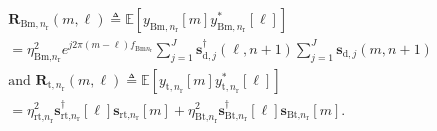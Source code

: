 \documentclass[9pt,journal]{IEEEtran}
\newcommand{\paren}[1]{\left({#1}\right)}
\newcommand{\bracket}[1]{{\left [{#1}\right ]}}
\newcommand{\rr}{_\mathrm{r}}
\newcommand{\B}{\textrm{B}}
\newcommand{\rnr}{_{\mathrm{r},n_\mathrm{r}}}
\newcommand{\target}{\mathrm{t}}
\newcommand{\PBj}{\mathbf{P}_{\textrm{d},j}\bracket{k}}
\newcommand{\PBjm}{\mathbf{P}_{\textrm{d},j}\bracket{m}}
\theoremstyle{definition}
\begin{document}
\begin{align}
&\mathbf{R}_{\mathrm{Bm},n\rr}\paren{m,\ell}\triangleq\mathbb{E}\bracket{y_{\mathrm{Bm},n\rr}\bracket{m}y^\ast_{\mathrm{Bm},n\rr}\bracket{\ell}}\nonumber\\
&=\eta^2_{\textrm{Bm,}n\rr}e^{j2\pi\paren{m-\ell}f_{\mathrm{Bm}n\rr}} \sum_{j=1}^{\mathit{J}}\mathbf{s}^\dagger_{\textrm{d},j}\paren{\ell,n+1}\sum_{j=1}^{\mathit{J}}\mathbf{s}_{\textrm{d},j}\paren{m,n+1}\nonumber\\
&\textrm{and }\mathbf{R}_{\target,n\rr}\paren{m,\ell}\triangleq\mathbb{E}\bracket{y_{\mathrm{t},n\rr}\bracket{m}y^\ast_{\mathrm{t},n\rr}\bracket{\ell}}\nonumber\\
&=\eta^2_{\textrm{rt,}n\rr}\mathbf{s}^\dagger_{\textrm{rt,}n\rr}\bracket{\ell}\mathbf{s}_{\textrm{rt,}n\rr}\bracket{m}+\eta^2_{\textrm{Bt,}n\rr}\mathbf{s}^\dagger_{\textrm{Bt,}n\rr}\bracket{\ell}\mathbf{s}_{\textrm{Bt,}n\rr}\bracket{m}.\nonumber
\end{align}\normalsize
	
\end{document}
